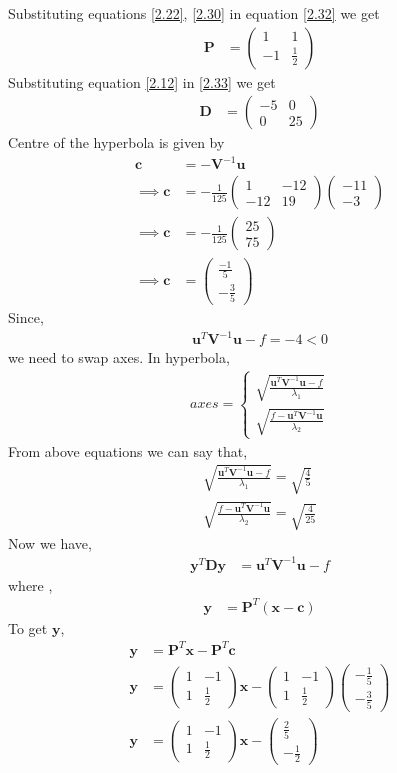 \documentclass[journal,12pt,twocolumn]{IEEEtran}
\let\vec\mathbf
\numberwithin{equation}{subsection}
\newcommand{\myvec}[1]{\ensuremath{\begin{pmatrix}#1\end{pmatrix}}}
\begin{document}
Substituting equations \ref{2.22}, \ref{2.30} in equation \ref{2.32} we get 
\begin{align}
    \vec{P}&=\myvec{1 & 1 \\-1 & \frac{1}{2}}\label{2.34}
\end{align}
Substituting equation \ref{2.12} in \ref{2.33} we get
\begin{align}
       \vec{D}&=\myvec{-5 & 0\\0 & 25}\label{2.35}
\end{align}
Centre of the hyperbola is given by 
\begin{align}
    \vec{c}&=-\vec{V}^{-1}\vec{u}\\
    \implies\vec{c}&=-\frac{1}{125}\myvec{1&-12\\-12&19}\myvec{-11 \\ -3}\\
    \implies\vec{c}&=-\frac{1}{125}\myvec{25\\ 75}\\
    \implies\vec{c}&=\myvec{\frac{-1}{5}\\-\frac{3}{5}}
\end{align}
Since,
\begin{align}
    \vec{u}^T\vec{V}^{-1}\vec{u}-f = -4 < 0\label{2.40}
\end{align} 
we need to swap axes. In hyperbola,
\begin{align}
axes=
\begin{cases}
\sqrt{\frac{\vec{u}^T\vec{V}^{-1}\vec{u}-f}{\lambda_1}}\\ \sqrt{\frac{f-\vec{u}^T\vec{V}^{-1}\vec{u}}{\lambda_2}}
\end{cases}
\end{align}
From above equations we can say that,
\begin{align}
\sqrt{\frac{\vec{u}^T\vec{V}^{-1}\vec{u}-f}{\lambda_1}}=\sqrt{ \frac{4}{5}}\\
\sqrt{\frac{f-\vec{u}^T\vec{V}^{-1}\vec{u}}{\lambda_2}}=\sqrt{ \frac{4}{25}}
\end{align}
Now we have,
\begin{align}
    \vec{y}^T\vec{D}\vec{y}&=\vec{u}^T\vec{V}^{-1}\vec{u}-f \label{2.44}
\end{align}
where ,
\begin{align}
    \vec{y}&=\vec{P}^T(\vec{x}-\vec{c})
\end{align}
To get $\vec{y}$,
\begin{align}
\vec{y}&=\vec{P}^T\vec{x}-\vec{P}^T\vec{c}\\
    \vec{y}&= \myvec{1 & -1 \\ 1 & \frac{1}{2}}\vec{x}-\myvec{1 & -1 \\ 1 & \frac{1}{2}}\myvec{-\frac{1}{5}\\-\frac{3}{5}}\\
    \vec{y}&=\myvec{1 & -1 \\ 1 & \frac{1}{2}}\vec{x}-\myvec{\frac{2}{5}\\ -\frac{1}{2}}
\end{align}
\end{document}
